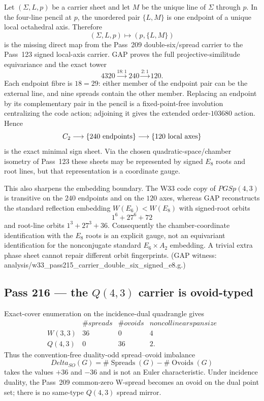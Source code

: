 \documentclass[12pt,a4paper]{article}
\def\mathrm#1{#1}%
\def\texttt#1{#1}%
\def\text#1{#1}%
\def\Delta{Delta}%
\def\cdot{ }%
\theoremstyle{definition}
\newcommand{\PGSp}{\mathrm{PGSp}}
\begin{document}
Let $(\Sigma,L,p)$ be a carrier sheet and let $M$ be the unique line of
$\Sigma$ through $p$.  In the four-line pencil at $p$, the unordered pair
$\{L,M\}$ is one endpoint of a unique local octahedral axis.  Therefore
\[
 (\Sigma,L,p)\longmapsto (p,\{L,M\})
\]
is the missing direct map from the Pass~209 double-six/spread carrier to the
Pass~123 signed local-axis carrier.  GAP proves the full projective-similitude
equivariance and the exact tower
\[
 4320\xrightarrow{18:1}240\xrightarrow{2:1}120.
\]
Each endpoint fibre is $18=2\cdot9$: either member of the endpoint pair can
be the external line, and nine spreads contain the other member.  Replacing
an endpoint by its complementary pair in the pencil is a fixed-point-free
involution centralizing the code action; adjoining it gives the extended
order-$103680$ action.  Hence
\[
 C_2\longrightarrow\{240\hbox{ endpoints}\}
 \longrightarrow\{120\hbox{ local axes}\}
\]
is the exact minimal sign sheet.  Via the chosen quadratic-space/chamber
isometry of Pass~123 these sheets may be represented by signed $E_8$ roots
and root lines, but that representation is a coordinate gauge.

This also sharpens the embedding boundary.  The W33 code copy of
$\PGSp(4,3)$ is transitive on the $240$ endpoints and on the $120$ axes,
whereas GAP reconstructs the standard reflection embedding
$W(E_6)<W(E_8)$ with signed-root orbits
\[
 1^6+27^6+72
\]
and root-line orbits $1^3+27^3+36$.  Consequently the chamber-coordinate
identification with the $E_8$ roots is an explicit gauge, not an equivariant
identification for the nonconjugate standard $E_6\times A_2$ embedding.  A
trivial extra phase sheet cannot repair different orbit fingerprints.
(GAP witness:
\texttt{analysis/w33\_pass215\_carrier\_double\_six\_signed\_e8.g}.)

\subsection{Pass 216 --- the $Q(4,3)$ carrier is ovoid-typed}
\label{ssec:pass216}

Exact-cover enumeration on the incidence-dual quadrangle gives
\[
\begin{array}{c|cc|c}
 &\#\text{spreads}&\#\text{ovoids}&
 \text{noncollinear span size}\\ \hline
 W(3,3)&36&0&4\\
 Q(4,3)&0&36&2.
\end{array}
\]
Thus the convention-free duality-odd spread--ovoid imbalance
\[
 \Delta_{SO}(G)=\#\operatorname{Spreads}(G)-\#\operatorname{Ovoids}(G)
\]
takes the values $+36$ and $-36$ and is not an Euler characteristic.  Under
incidence duality, the Pass~209 common-zero W-spread becomes an ovoid on the
dual point set; there is no same-type $Q(4,3)$
spread mirror.
\end{document}
